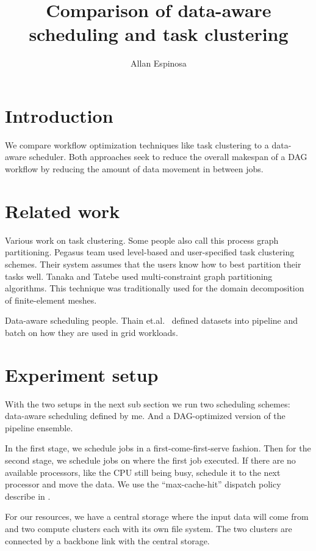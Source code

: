 \documentclass{article}
\title{Comparison of data-aware scheduling and task clustering}
\author{Allan Espinosa}
\begin{document}
\section{Introduction} %
\label{sec:introduction}
We compare workflow optimization techniques like task clustering to a data-aware
scheduler.  Both approaches seek to reduce the overall makespan of a DAG
workflow by reducing the amount of data movement in between jobs.


\section{Related work} %
\label{sec:related_work}

Various work on task clustering.  Some people also call this process graph
partitioning.  Pegasus \cite{Singh2008} team used level-based and user-specified
task clustering schemes.  Their system assumes that the users know how to best
partition their tasks well.  Tanaka and Tatebe \cite{Tanaka2012} used
multi-constraint graph partitioning algorithms.  This technique was
traditionally used for the domain decomposition of finite-element meshes.

Data-aware scheduling people.  Thain et.al.\ \cite{Thain2003} defined datasets
into pipeline and batch on how they are used in grid workloads.  


\section{Experiment setup} %
\label{sec:experiment_setup}

With the two setups in the next sub section we run two scheduling schemes:
data-aware scheduling defined by me.  And a DAG-optimized version of the
pipeline ensemble.

In the first stage, we schedule jobs in a first-come-first-serve fashion.  Then
for the second stage, we schedule jobs on where the first job executed.  If
there are no available processors, like the CPU still being busy, schedule it to
the next processor and move the data.  We use the  ``max-cache-hit'' dispatch
policy describe in \cite{Raicu2008a}.

For our resources, we have a central storage where the input data will come from
and two compute clusters each with its own file system.  The two clusters are
connected by a backbone link with the central storage.
\end{document}

